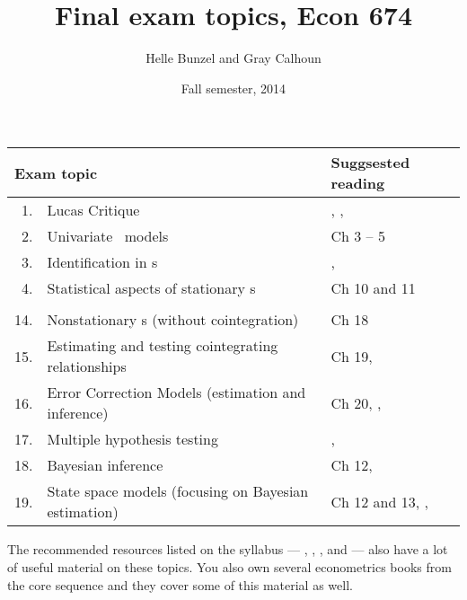 \documentclass[nofonts,nols]{tufte-handout}
\title{Final exam topics, Econ 674}
\author{Helle Bunzel and Gray Calhoun}
\date{Fall semester, 2014}
\renewcommand{\allcaps}[1]{\textls{\MakeUppercase{#1}}}
\newcommand{\ARMA}{\allcaps{ARMA}}
\newcommand{\SVAR}{\allcaps{SVAR}}
\newcommand{\VAR}{\allcaps{VAR}}
\begin{document}
\maketitle

\begin{table*}[h]
  \begin{tabularx}{\textwidth}{rlX}
    \toprule
    \multicolumn{2}{l}{Exam topic}                                                & Suggsested reading                                    \\
    \midrule
    1. & Lucas Critique                                       & \citep{Lu76}, \citep{No11}, \citep{Si12}              \\
    2. & Univariate \ARMA\ models                             & \citep{Ha94} Ch 3 -- 5                                \\
    3. & Identification in \SVAR s                            & \citep{Si80}, \citep{Ki13}                            \\
    4. & Statistical aspects of stationary \VAR s             & \citep{Ha94} Ch 10 and 11                             \\
    \\
    14. & Nonstationary \VAR s (without cointegration)         & \citep{Ha94} Ch 18                                    \\
    15. & Estimating and testing cointegrating relationships   & \citep{Ha94} Ch 19,  \citep{Jo14}                     \\
    16. & Error Correction Models (estimation and inference)   & \citep{Ha94} Ch 20, \citep{Da13}, \citep{Jo14}        \\
    17. & Multiple hypothesis testing                          & \citep{RW05}, \citep{Ro08}                            \\
    18. & Bayesian inference                                   & \citep{Ha94} Ch 12, \citep{Ch12}                      \\
    19. & State space models (focusing on Bayesian estimation) & \citep{Ha94} Ch 12 and 13, \citep{Fe11}, \citep{Ch12} \\
    \bottomrule
  \end{tabularx}
\end{table*}

\noindent%
The recommended resources listed on the syllabus --- \citep{Lu06},
\citep{Ca07}, \citep{MS08}, and \citep{SW08} --- also have a lot of
useful material on these topics. You also own several econometrics
books from the core sequence and they cover some of this material as
well.



\end{document}
